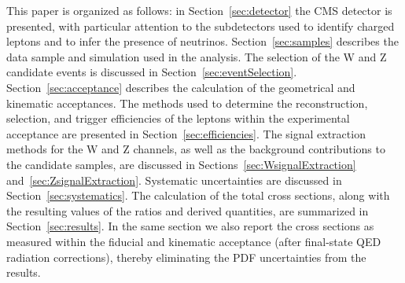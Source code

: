 This paper is organized as follows: in Section~\ref{sec:detector} the CMS detector is presented,
with particular attention to the subdetectors 
used to identify charged leptons and to infer the presence of neutrinos. 
Section~\ref{sec:samples} describes the data sample and simulation 
used in the analysis. The selection of the W and Z candidate 
events is discussed in Section~\ref{sec:eventSelection}. Section~\ref{sec:acceptance} describes 
the calculation of the geometrical and kinematic acceptances. 
%
%
The methods used to determine the 
reconstruction, selection, and trigger efficiencies of the leptons within 
the experimental acceptance are presented in Section~\ref{sec:efficiencies}. 
The signal extraction methods for the W and Z channels, as well as 
the background contributions to the
candidate samples, are discussed in Sections~\ref{sec:WsignalExtraction} 
and~\ref{sec:ZsignalExtraction}. Systematic uncertainties are
discussed in Section~\ref{sec:systematics}. The calculation of the 
total cross sections, along with the resulting values of the ratios and derived quantities, 
are summarized in Section~\ref{sec:results}. In the same section we also report the cross 
sections as measured within the fiducial and kinematic acceptance (after final-state QED 
radiation corrections), thereby eliminating the PDF uncertainties from the results.  


